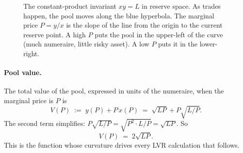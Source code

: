 \documentclass[11pt]{article}
\theoremstyle{definition}
\theoremstyle{remark}
\newcommand{\1}{\mathbf{1}}
\begin{document}
\begin{figure}[h]
\centering
{}
\caption{The constant-product invariant $xy = L$ in reserve space. As trades happen, the pool moves along the blue hyperbola. The marginal price $P = y/x$ is the slope of the line from the origin to the current reserve point. A high $P$ puts the pool in the upper-left of the curve (much numeraire, little risky asset). A low $P$ puts it in the lower-right.}
\label{fig:invariant}
\end{figure}

\paragraph{Pool value.}
The total value of the pool, expressed in units of the numeraire, when the marginal price is $P$ is
\[
V(P) \;:=\; y(P) + P\,x(P) \;=\; \sqrt{LP} + P\sqrt{L/P}.
\]
The second term simplifies: $P\sqrt{L/P} = \sqrt{P^2 \cdot L/P} = \sqrt{LP}$. So
\begin{equation}\label{eq:V}
\boxed{V(P) \;=\; 2\sqrt{LP}.}
\end{equation}
This is the function whose curvature drives every LVR calculation that follows.
\end{document}
